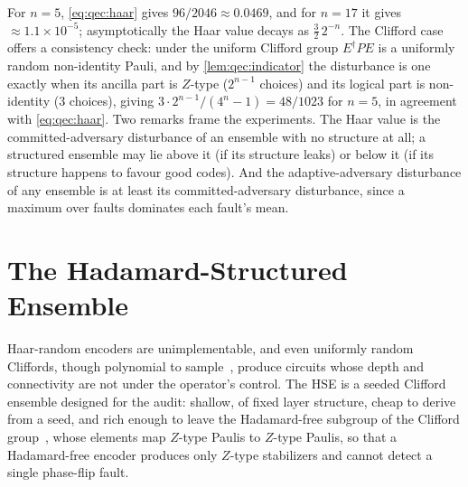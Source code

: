 For $n=5$, \cref{eq:qec:haar} gives $96/2046\approx 0.0469$, and for $n=17$ it gives $\approx 1.1\times 10^{-5}$; asymptotically the Haar value decays as $\tfrac{3}{2}\,2^{-n}$. The Clifford case offers a consistency check: under the uniform Clifford group $E^{\dagger}PE$ is a uniformly random non-identity Pauli, and by \cref{lem:qec:indicator} the disturbance is one exactly when its ancilla part is $Z$-type ($2^{n-1}$ choices) and its logical part is non-identity ($3$ choices), giving $3\cdot 2^{n-1}/(4^{n}-1)=48/1023$ for $n=5$, in agreement with \cref{eq:qec:haar}. Two remarks frame the experiments. The Haar value is the committed-adversary disturbance of an ensemble with no structure at all; a structured ensemble may lie above it (if its structure leaks) or below it (if its structure happens to favour good codes). And the adaptive-adversary disturbance of any ensemble is at least its committed-adversary disturbance, since a maximum over faults dominates each fault's mean.

\section{The Hadamard-Structured Ensemble}\label{sec:qec:hse}

Haar-random encoders are unimplementable, and even uniformly random Cliffords, though polynomial to sample~\cite{koenig2014clifford}, produce circuits whose depth and connectivity are not under the operator's control. The HSE is a seeded Clifford ensemble designed for the audit: shallow, of fixed layer structure, cheap to derive from a seed, and rich enough to leave the Hadamard-free subgroup of the Clifford group~\cite{bravyi2021hadamardfree}, whose elements map $Z$-type Paulis to $Z$-type Paulis, so that a Hadamard-free encoder produces only $Z$-type stabilizers and cannot detect a single phase-flip fault.

